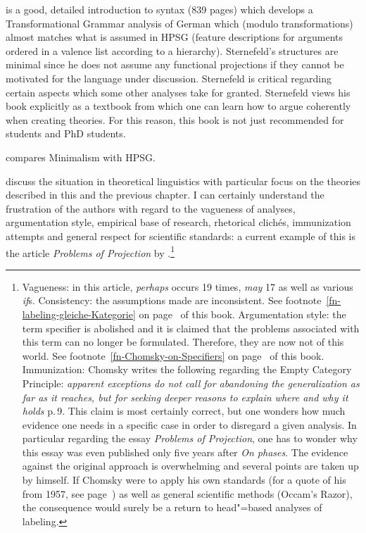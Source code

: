 { is a good, detailed introduction to syntax (839 pages) which develops a Transformational Grammar analysis of German which
(modulo transformations) almost matches what is assumed in HPSG (feature descriptions for arguments ordered in a valence list according to a 
hierarchy). Sternefeld's structures are minimal since he does not assume any functional projections if they cannot be motivated for the language
under discussion. Sternefeld is critical regarding certain aspects which some other analyses take for granted. Sternefeld views his book explicitly
as a textbook from which one can learn how to argue coherently when creating theories. For this reason, this book is not just 
recommended for students and PhD students.

\citet{BM2020Minimalism} compares Minimalism with HPSG.

\citet{SR2012a} discuss the situation in theoretical linguistics with particular focus on the
theories described in this and the previous chapter. I can certainly understand the frustration of
the authors with regard to the vagueness of analyses, argumentation style, empirical base of
research, rhetorical clich\'{e}s, immunization attempts and general respect for scientific
standards: a current example of this is the article \emph{Problems of Projection} by \citet{Chomsky2013a}.\footnote{%
  Vagueness: in this article, \emph{perhaps} occurs 19 times, \emph{may} 17 as well as various \emph{if}s. Consistency: the assumptions made
  are inconsistent. See footnote~\ref{fn-labeling-gleiche-Kategorie} on
  page~\pageref{fn-labeling-gleiche-Kategorie} of this book. Argumentation style: the
  term specifier is abolished and it is claimed that the problems associated with this term can no longer be formulated. Therefore, they are now
  not of this world. See footnote~\ref{fn-Chomsky-on-Specifiers} on
  page~\pageref{fn-Chomsky-on-Specifiers} of this book. Immunization: Chomsky writes the following regarding the Empty Category Principle:
  \emph{apparent exceptions do not call for abandoning the generalization as far as it reaches, but for seeking
  deeper reasons to explain where and why it holds} p.\,9. This claim is most certainly correct, but one wonders how much evidence one needs
  in a specific case in order to disregard a given analysis. In particular regarding the essay \emph{Problems of Projection}, one has to wonder
  why this essay was even published only five years after \emph{On phases}. The evidence against the original approach is overwhelming and several
  points are taken up by \citet{Chomsky2013a} himself. If Chomsky were to apply his own standards (for a quote of his from 1957, see
  page~\pageref{quote-Chomsky-Formalisierung}) as well as general scientific methods (Occam's Razor), the consequence would surely be a return
  to head"=based analyses of labeling.

}}
